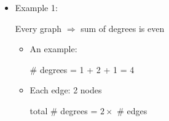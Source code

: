 \begin{frame}[allowframebreaks]
\begin{itemize}
  \item Example 1:

Every graph $\Rightarrow$ sum of degrees is even
\begin{itemize}
\item An example:
    \begin{center}
\end{center}
\# degrees = 1 + 2 + 1 = 4
\item Each edge: 2 nodes
  \begin{center}
total \# degrees = $2\times $ \# edges
\end{center}
\end{itemize}


\end{itemize}
\end{frame}
